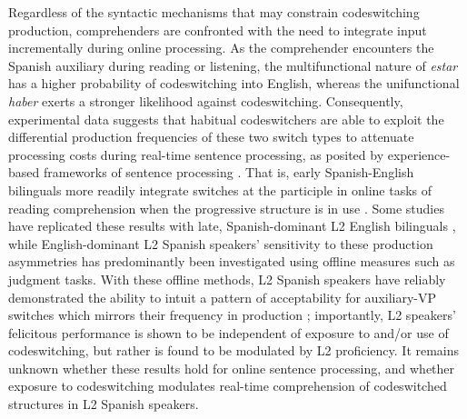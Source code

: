 \documentclass[output=paper,colorlinks,citecolor=brown]{langscibook}
\begin{document}
Regardless of the syntactic mechanisms that may constrain codeswitching production, comprehenders are confronted with the need to integrate input incrementally during online processing. As the comprehender encounters the Spanish auxiliary during reading or listening, the multifunctional nature of \textit{estar} has a higher probability of codeswitching into English, whereas the unifunctional \textit{haber} exerts a stronger likelihood against codeswitching. Consequently, experimental data suggests that habitual codeswitchers are able to exploit the differential production frequencies of these two switch types to attenuate processing costs during real-time sentence processing, as posited by experience-based frameworks of sentence processing \citep{DellChang2014,MacDonald2013}. That is, early Spanish-English bilinguals more readily integrate switches at the participle in online tasks of reading comprehension when the progressive structure is in use \citep{Dussias2003,GuzzardoTamargoetal2016,ValdesKroffetal2018}. Some studies have replicated these results with late, Spanish-dominant L2 English bilinguals \citep{Guzzardo2013,GuzzardoTamargoetal2016}, while English-dominant L2 Spanish speakers’ sensitivity to these production asymmetries has predominantly been investigated using offline measures such as judgment tasks. With these offline methods, L2 Spanish speakers have reliably demonstrated the ability to intuit a pattern of acceptability for auxiliary-VP switches which mirrors their frequency in production \citep{Giancaspro2015,Koronkiewicz2018,Toribio2001}; importantly, L2 speakers’ felicitous performance is shown to be independent of exposure to and/or use of codeswitching, but rather is found to be modulated by L2 proficiency. It remains unknown whether these results hold for online sentence processing, and whether exposure to codeswitching modulates real-time comprehension of codeswitched structures in L2 Spanish speakers.
\end{document}
